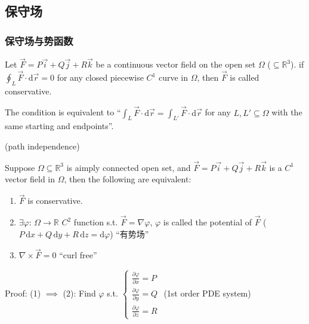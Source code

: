 \subsection{保守场}
\subsubsection{保守场与势函数}

\begin{definition}
    Let $\overrightarrow{F}=P\overrightarrow{i}+Q\overrightarrow{j}+R\overrightarrow{k}$ be a continuous vector field on the open set $\Omega$ ($\subseteq\mathbb{R}^3$). if $\oint_L\overrightarrow{F}\cdot\mathrm{d}\overrightarrow{r}=0$ for any closed piecewise $C^1$ curve in $\Omega$, then $\overrightarrow{F}$ is called conservative.
\end{definition}

\begin{remark}
    The condition is equivalent to ``$\int_L\overrightarrow{F}\cdot\mathrm{d}\overrightarrow{r}=\int_{L'}\overrightarrow{F}\cdot\mathrm{d}\overrightarrow{r}$ for any $L,L'\subseteq\Omega$ with the same starting and endpoints''.
\end{remark}

(path independence)

\begin{theorem}
    Suppose $\Omega\subseteq\mathbb{R}^3$ is aimply connected open set, and $\overrightarrow{F}=P\overrightarrow{i}+Q\overrightarrow{j}+R\overrightarrow{k}$ is a $C^1$ vector field in $\Omega$, then the following are equivalent:
    \begin{enumerate}
        \item $\overrightarrow{F}$ is conservative.
        \item $\exists\varphi:\,\Omega\to\mathbb{R}$ $C^2$ function s.t. $\overrightarrow{F}=\nabla\varphi$, $\varphi$ is called the potential of $\overrightarrow{F}$ ($P\,\mathrm{d}x+Q\,\mathrm{d}y+R\,\mathrm{d}z=\mathrm{d}\varphi$) ``有势场''
        \item $\nabla\times\overrightarrow{F}=0$ ``curl free''
    \end{enumerate}
\end{theorem}

Proof: (1) $\implies$ (2): Find $\varphi$ s.t. $\begin{cases}
        \frac{\partial\varphi}{\partial x}=P \\
        \frac{\partial\varphi}{\partial y}=Q \\
        \frac{\partial\varphi}{\partial z}=R
    \end{cases}$ (1st order PDE system)


